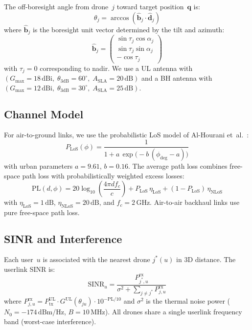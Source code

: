 \documentclass[conference]{IEEEtran}
\newcommand{\vect}[1]{\bm{#1}}
\newcommand{\bore}[1]{\hat{\vect{b}}_{#1}}
\newcommand{\dB}{\,\mathrm{dB}}
\newcommand{\dBi}{\,\mathrm{dBi}}
\newcommand{\dBm}{\,\mathrm{dBm}}
\begin{document}
The off-boresight angle from drone~$j$ toward target position~$\vect{q}$ is:
\begin{equation}
\theta_{j} = \arccos\!\left(\bore{j} \cdot \hat{\vect{d}}_{j}\right)
\end{equation}
where $\bore{j}$ is the boresight unit vector determined by the tilt and azimuth:
\begin{equation}
\bore{j} = \begin{pmatrix} \sin\tau_j\cos\alpha_j \\ \sin\tau_j\sin\alpha_j \\ -\cos\tau_j \end{pmatrix}
\end{equation}
with $\tau_j = 0$ corresponding to nadir.
We use a UL antenna with $(G_{\max} = 18\dBi,\; \theta_{3\mathrm{dB}} = 60^\circ,\; A_{\mathrm{SLA}} = 20\dB)$ and a BH antenna with $(G_{\max} = 12\dBi,\; \theta_{3\mathrm{dB}} = 30^\circ,\; A_{\mathrm{SLA}} = 25\dB)$.

\subsection{Channel Model}

For air-to-ground links, we use the probabilistic LoS model of Al-Hourani et~al.~\cite{alhourani2014}:
\begin{equation}
P_{\mathrm{LoS}}(\phi) = \frac{1}{1 + a\,\exp\!\big(-b\,(\phi_{\mathrm{deg}} - a)\big)}
\end{equation}
with urban parameters $a = 9.61$, $b = 0.16$.
The average path loss combines free-space path loss with probabilistically weighted excess losses:
\begin{equation}
\mathrm{PL}(d, \phi) = 20\log_{10}\!\left(\frac{4\pi d f_c}{c}\right) + P_{\mathrm{LoS}}\,\eta_{\mathrm{LoS}} + (1 - P_{\mathrm{LoS}})\,\eta_{\mathrm{NLoS}}
\end{equation}
with $\eta_{\mathrm{LoS}} = 1\dB$, $\eta_{\mathrm{NLoS}} = 20\dB$, and $f_c = 2$\,GHz.
Air-to-air backhaul links use pure free-space path loss.

\subsection{SINR and Interference}

Each user~$u$ is associated with the nearest drone $j^*(u)$ in 3D distance.
The userlink SINR is:
\begin{equation}
\label{eq:sinr}
\mathrm{SINR}_u =\frac{P_{j^*,u}^{\mathrm{rx}}}{\sigma^2 + \sum_{j \neq j^*} P_{j,u}^{\mathrm{rx}}}
\end{equation}
where $P_{j,u}^{\mathrm{rx}} = P_{\mathrm{tx}}^{\mathrm{UL}} \cdot G^{\mathrm{UL}}(\theta_{ju}) \cdot 10^{-\mathrm{PL}/10}$ and $\sigma^2$ is the thermal noise power ($N_0 = -174\dBm$/Hz, $B = 10$\,MHz).
All drones share a single userlink frequency band (worst-case interference).
\end{document}
